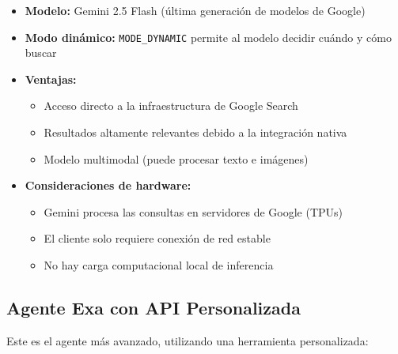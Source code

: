 \documentclass[12pt,a4paper]{article}
\begin{document}
\begin{itemize}
    \item \textbf{Modelo:} Gemini 2.5 Flash (última generación de modelos de Google)
    \item \textbf{Modo dinámico:} \texttt{MODE\_DYNAMIC} permite al modelo decidir cuándo y cómo buscar
    \item \textbf{Ventajas:}
    \begin{itemize}
        \item Acceso directo a la infraestructura de Google Search
        \item Resultados altamente relevantes debido a la integración nativa
        \item Modelo multimodal (puede procesar texto e imágenes)
    \end{itemize}
    \item \textbf{Consideraciones de hardware:}
    \begin{itemize}
        \item Gemini procesa las consultas en servidores de Google (TPUs)
        \item El cliente solo requiere conexión de red estable
        \item No hay carga computacional local de inferencia
    \end{itemize}
\end{itemize}

\subsection{Agente Exa con API Personalizada}

Este es el agente más avanzado, utilizando una herramienta personalizada:
\end{document}
